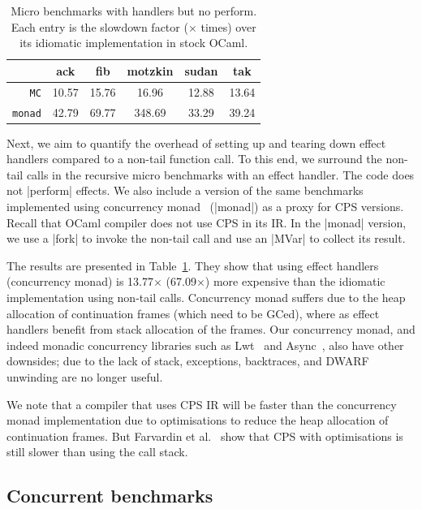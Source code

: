 \documentclass[sigplan,10pt,review,anonymous]{acmart}\settopmatter{printfolios=true,printccs=false,printacmref=false}
\begin{document}
\begin{table}
\caption{Micro benchmarks with handlers but no perform. Each entry is the
	slowdown factor ($\times$ times) over its idiomatic implementation in stock OCaml.}
\vspace{-3mm}
{
\begin{tabular}{r c c c c c}
	& \textbf{ack} & \textbf{fib} & \textbf{motzkin} & \textbf{sudan} & \textbf{tak} \\ \hline
	\texttt{MC} 	 	& 10.57 & 15.76 & 16.96 & 12.88 & 13.64 \\
	\texttt{monad} 	& 42.79 & 69.77 & 348.69 & 33.29 & 39.24 \\ \hline
\end{tabular}
}
\label{tab:micro_noperform}
	\vspace{-5mm}
\end{table}

Next, we aim to quantify the overhead of setting up and tearing down effect
handlers compared to a non-tail function call. To this end, we surround the
non-tail calls in the recursive micro benchmarks with an effect handler. The
code does not |perform| effects. We also include a version of the same
benchmarks implemented using concurrency monad~\cite{Claessen99} (|monad|) as a
proxy for CPS versions. Recall that OCaml compiler does not use CPS in its IR.
In the |monad| version, we use a |fork| to invoke the non-tail call and use an
|MVar| to collect its result.

The results are presented in Table~\ref{tab:micro_noperform}. They show that
using effect handlers (concurrency monad) is 13.77$\times$ (67.09$\times$) more
expensive than the idiomatic implementation using non-tail calls. Concurrency
monad suffers due to the heap allocation of continuation frames (which need to
be GCed), where as effect handlers benefit from stack allocation of the frames.
Our concurrency monad, and indeed monadic concurrency libraries such as
Lwt~\cite{lwt} and Async~\cite{async}, also have other downsides; due to the
lack of stack, exceptions, backtraces, and DWARF unwinding are no longer
useful.

We note that a compiler that uses CPS IR will be faster than the concurrency
monad implementation due to optimisations to reduce the heap allocation of
continuation frames. But Farvardin et al.~\cite{Farvardin20} show that CPS with
optimisations is still slower than using the call stack.

\vspace{-3mm}
\subsection{Concurrent benchmarks}
\end{document}
